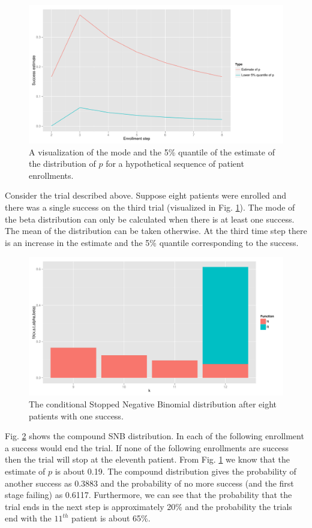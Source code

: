 \documentclass[12pt]{article}         %
\begin{document}
\begin{figure}[ht]
\includegraphics[width=\textwidth]{hypo_traj.pdf}
\caption{
A visualization of the mode and the 5\% quantile of the estimate of the distribution of $p$ for a hypothetical sequence of patient enrollments.
}
\label{fig:hypo}
\end{figure}

Consider the trial described above. Suppose eight patients were enrolled and 
there was a single success on the third trial (visualized in Fig. 
\ref{fig:hypo}). The mode of the beta distribution can only be calculated when 
there is at least one success. The mean of the distribution can be
taken otherwise. At the third time step there is an increase in the estimate and the 5\% quantile corresponding to the success. 

\begin{figure}[ht]
\includegraphics[width=\textwidth]{conditional_snb.pdf}
\caption{
The conditional Stopped Negative Binomial distribution after eight patients with one success.
}
\label{fig:conditional_snb}
\end{figure}

Fig. \ref{fig:conditional_snb} shows the compound SNB distribution. In each of the following enrollment a success would end the trial. If none of the following enrollments are success then the trial will stop at the eleventh patient. From Fig. \ref{fig:hypo} we know that the estimate of $p$ is about 0.19. The compound distribution gives the probability of another success as 0.3883 and the probability of no more success (and the first stage failing) as 0.6117. Furthermore, we can see that the probability that the trial ends in the next step is approximately 20\% and the probability the trials end with the $11^{th}$ patient is about 65\%.
\end{document}
